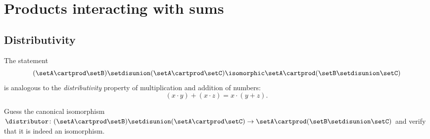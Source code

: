 


\section{Products interacting with sums}
\label{sec:arithemetic-products-sums}




\subsection{Distributivity}

The statement
\begin{equation}\label{eq:sets-distributor}
    (\setA \cartprod \setB) \setdisunion (\setA \cartprod \setC)  \isomorphic \setA \cartprod (\setB \setdisunion \setC)
\end{equation}
is analogous to the \emph{distributivity} property of multiplication and addition of numbers:
\begin{equation}\label{eq:arithmetic-distributive-law}
    (x \cdot y) + (x \cdot z)  = x \cdot (y + z).
\end{equation}

\begin{exercise}\label{ex:distributivity-isomorphism}
    Guess the canonical isomorphism $\distributor \colon (\setA \cartprod \setB) \setdisunion (\setA \cartprod \setC) \to \setA \cartprod (\setB \setdisunion \setC)$ and verify that it is indeed an isomorphism.
\end{exercise}

\begin{solution}
\end{solution}
